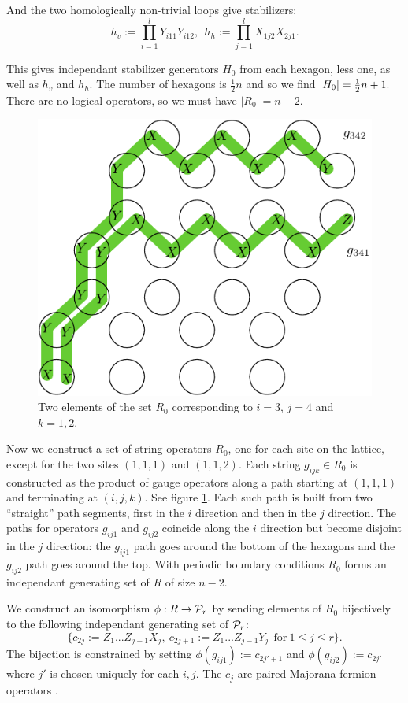 \documentclass[12pt,notitlepage,longbibliography,nofootinbib,tightenlines]{revtex4}
\begin{document}
And the two homologically non-trivial loops
give stabilizers:
$$
h_v := \prod_{i=1}^l Y_{i11} Y_{i12},\ \ 
h_h := \prod_{j=1}^l X_{1j2} X_{2j1}.
$$

This gives independant stabilizer generators $H_0$
from each hexagon, less one, as well as $h_v$ and $h_h.$
The number of hexagons is $\frac{1}{2}n$ and
so we find $|H_0|=\frac{1}{2} n+1.$
There are no logical operators, so we
must have $|R_0|=n-2.$

\begin{figure}[th!]
\begin{center}
        \includegraphics[width=0.5\columnwidth]{fig_01.pdf}
\caption{Two elements of the set $R_0$ corresponding
to $i=3$, $j=4$ and $k=1,2.$}
\label{jaws}
\end{center}
\end{figure}

Now we construct a set of string operators $R_0$,
one for each site on the lattice, except for
the two sites $(1,1,1)$ and $(1,1,2).$
Each string $g_{ijk}\in R_0$
is constructed as the product of
gauge operators along a path starting at
$(1,1,1)$ and terminating at $(i,j,k).$
See figure \ref{jaws}.
Each such path is built from two ``straight''
path segments, first in the $i$ direction
and then in the $j$ direction. 
The paths for operators $g_{ij1}$ and
$g_{ij2}$ coincide along the $i$ direction
but become disjoint in the $j$ direction:
the $g_{ij1}$ path goes around the bottom
of the hexagons and the $g_{ij2}$ path
goes around the top.
With periodic boundary conditions $R_0$ forms an
independant generating set of $R$ of size $n-2.$

We construct an isomorphism $\phi: R\to \mathcal{P}_r$
by sending elements of $R_0$ bijectively
to the following independant generating
set of $\mathcal{P}_r$:
$$
\big\{c_{2j}:=Z_1...Z_{j-1} X_j,\ c_{2j+1}:=Z_1...Z_{j-1} Y_j\ \ \mbox{for}\ 1\le j\le r\big\}.
$$
The bijection is constrained 
by setting $\phi(g_{ij1}):=c_{2j'+1}$
and $\phi(g_{ij2}):=c_{2j'}$
where $j'$ is chosen uniquely for each $i, j.$
The $c_j$ are paired Majorana fermion operators \cite{Kitaev2006}.
\end{document}
